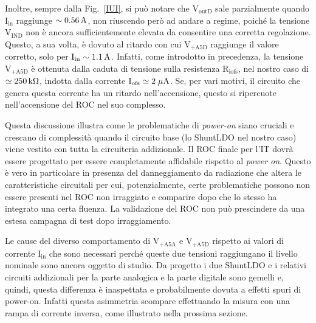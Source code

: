 Inoltre, sempre dalla Fig.~\ref{IUI}, si può notare che $\mathrm{V_{outD}}$ sale parzialmente quando $\mathrm{I_{in}}$ raggiunge $\sim0.56\rm \, A$, non riuscendo però ad andare a regime, poiché la tensione $\mathrm{V_{IND}}$ non è ancora sufficientemente elevata da consentire una corretta regolazione. Questo, a sua volta, è dovuto al ritardo con cui $\mathrm{V_{+A5D}}$ raggiunge il valore corretto, solo per $\mathrm{I_{in}\sim 1.1\rm \, A}$. Infatti, come introdotto in precedenza, la tensione  $\mathrm{V_{+A5D}}$ è ottenuta dalla caduta di tensione sulla resistenza $\mathrm{R_{iofs}}$, nel nostro caso di $\simeq 250{\rm \, k\Omega}$, indotta dalla corrente $\mathrm{I_{ofs} \simeq 2 \; \mu \rm A}$. Se, per vari motivi, il circuito che genera questa corrente ha un ritardo nell'accensione, questo si ripercuote nell'accensione del ROC nel suo complesso.  

Questa discussione illustra come le problematiche di {\em power-on} siano cruciali e crescano di complessit\`a quando il circuito base (lo ShuntLDO nel nostro caso) viene vestito con tutta la circuiteria addizionale. Il ROC finale per l'IT dovr\`a essere progettato per essere completamente affidabile rispetto al {\em power on}. %
Questo \`e vero in particolare in presenza del danneggiamento da radiazione che altera le caratteristiche circuitali per cui, potenzialmente, certe problematiche possono non essere presenti nel ROC non irraggiato e comparire dopo che lo stesso ha integrato una certa fluenza. La validazione del ROC non pu\`o prescindere da una estesa campagna di test dopo irraggiamento.

Le cause del diverso comportamento di $\mathrm{V_{+A5A}}$ e $\mathrm{V_{+A5D}}$ rispetto ai valori di corrente $\mathrm{I_{in}}$ che sono necessari perché queste due tensioni raggiungano il livello nominale sono ancora oggetto di studio. Da progetto i due ShuntLDO e i relativi circuiti addizionali per la parte analogica e la parte digitale sono gemelli e, quindi, questa differenza \`e inaspettata e probabilmente dovuta a effetti spuri di power-on. Infatti questa asimmetria scompare effettuando la misura con una rampa di corrente inversa, come illustrato nella prossima sezione.

% 
%
%

